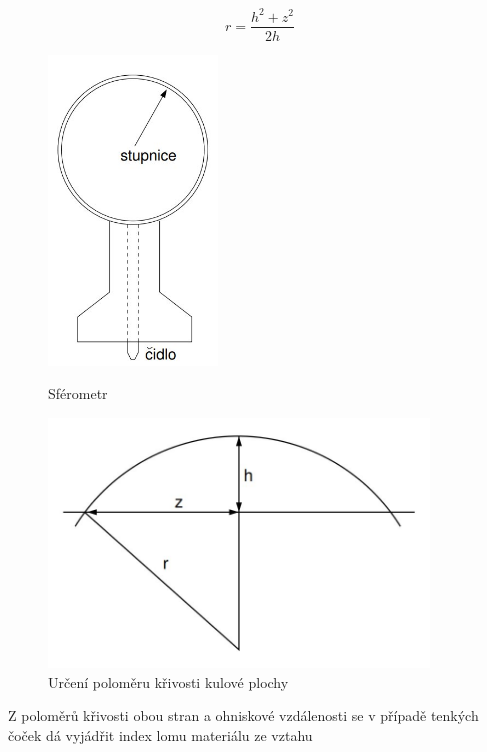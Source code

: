 \documentclass[a4paper,11pt]{article}
\begin{document}
\begin{equation}
r = \frac{h^2 + z^2}{2h}
\end{equation}

\begin{figure}[htpb]
    \begin{minipage}[b]{.45\linewidth}
        \centering
        \includegraphics[width=0.4\textwidth]{sferometr.jpg}
        \caption{Sférometr}
    \end{minipage} 
    \begin{minipage}[b]{.5\linewidth}
        \centering
        \includegraphics[width=0.9\textwidth]{kulova_plocha.jpg}
        \caption{Určení poloměru křivosti kulové plochy}
    \end{minipage} 
\end{figure}

Z poloměrů křivosti obou stran a ohniskové vzdálenosti se v případě tenkých čoček dá vyjádřit index lomu materiálu ze vztahu 
\end{document}

